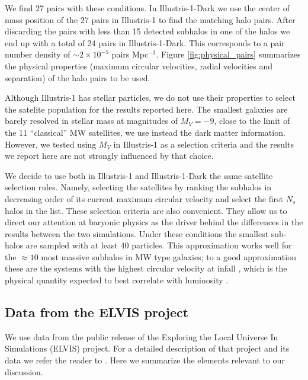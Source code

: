 \documentclass[a4paper,fleqn,usenatbib]{mnras}
\begin{document}
We find 27 pairs with these conditions. 
In Illustris-1-Dark we use the center of mass position of the 27 pairs
in Illustris-1 to find the matching halo pairs.
After discarding the pairs with less than 15 detected subhalos in one
of the halos we end up with a total of 24 pairs in Illustris-1-Dark. 
This corresponds to a pair number density of $\sim 2 \times10^{-5}$
pairs Mpc$^{-3}$. 
Figure \ref{fig:physical_pairs} summarizes the physical properties (maximum
circular velocities, radial velocities and separation) of the halo
pairs to be used.

Although Illustris-1 has stellar particles, we do not use their
properties to select the satelite population for the results reported
here. 
The smallest galaxies are barely resolved in stellar mass at
magnitudes of $M_V=-9$, close to the limit of the 11 ``classical'' MW
satellites, we use instead the dark matter information. 
However, we tested using $M_V$ in Illustris-1 as a selection criteria
and the results we report here are not strongly influenced by that
choice. 

We decide to use both in Illustris-1 and Illustris-1-Dark the same
satellite selection rules.
Namely, selecting the satellites by ranking the subhalos in decreasing
order of its current maximum circular velocity and select the first
$N_s$ halos in the list. 
These selection criteria are also convenient.
They allow us to direct our attention at baryonic physics as the driver
behind the differences in the results between the two simulations. 
Under these conditions the smallest sub-halos are sampled with at
least $40$ particles. This approximation works well for the $\approx 10$ most
massive subhalos in MW type galaxies; to a good approximation these
are the systems with the highest circular velocity at infall
\citep{2011MNRAS.415L..40B}, which is the physical quantity expected
to best correlate with luminosity
\citep{2004ApJ...609...35K,2006ApJ...647..201C,2010MNRAS.404.1111G}. 





\subsection{Data from the ELVIS project}
\label{sim:ELVIS}

We use data from the public release of the Exploring the Local
Universe In Simulations (ELVIS) project.
For a detailed description of that project and its data we refer the
reader to \cite{2014MNRAS.438.2578G}. 
Here we summarize the elements relevant to our discussion.
\end{document}
